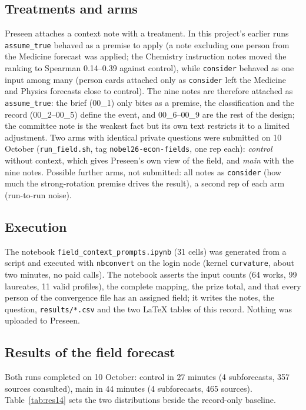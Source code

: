 \documentclass[11pt,a4paper]{article}
\newcommand{\code}[1]{\texttt{#1}}
\begin{document}
\subsection{Treatments and arms}

Preseen attaches a context note with a treatment. In this project's earlier runs \code{assume\_true} behaved as a
premise to apply (a note excluding one person from the Medicine forecast was applied; the Chemistry instruction notes
moved the ranking to Spearman 0.14--0.39 against control), while \code{consider} behaved as one input among many
(person cards attached only as \code{consider} left the Medicine and Physics forecasts close to control). The nine
notes are therefore attached as \code{assume\_true}: the brief (00\_1) only bites as a premise, the classification
and the record (00\_2--00\_5) define the event, and 00\_6--00\_9 are the rest of the design; the committee note is
the weakest fact but its own text restricts it to a limited adjustment. Two arms with identical private questions were
submitted on 10 October (\code{run\_field.sh}, tag \code{nobel26-econ-fields}, one rep each): \emph{control} without
context, which gives Preseen's own view of the field, and \emph{main} with the nine notes. Possible further arms,
not submitted: all notes as \code{consider} (how much the strong-rotation premise drives the result), a second rep
of each arm (run-to-run noise).

\subsection{Execution}

The notebook \code{field\_context\_prompts.ipynb} (31 cells) was generated from a script and executed with
\code{nbconvert} on the login node (kernel \code{curvature}, about two minutes, no paid calls). The notebook asserts the input counts (64
works, 99 laureates, 11 valid profiles), the complete mapping, the prize total, and that every person of the
convergence file has an assigned field; it writes the notes, the question, \code{results/*.csv} and the two LaTeX
tables of this record. Nothing was uploaded to Preseen.

\subsection{Results of the field forecast}

Both runs completed on 10 October: control in 27 minutes (4 subforecasts, 357 sources consulted), main in 44 minutes
(4 subforecasts, 465 sources). Table~\ref{tab:res14} sets the two distributions beside the record-only baseline.
\end{document}
